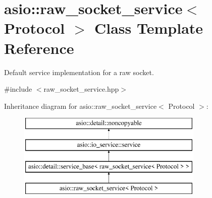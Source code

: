 \hypertarget{classasio_1_1raw__socket__service}{}\section{asio\+:\+:raw\+\_\+socket\+\_\+service$<$ Protocol $>$ Class Template Reference}
\label{classasio_1_1raw__socket__service}


Default service implementation for a raw socket.  




{\ttfamily \#include $<$raw\+\_\+socket\+\_\+service.\+hpp$>$}

Inheritance diagram for asio\+:\+:raw\+\_\+socket\+\_\+service$<$ Protocol $>$\+:\begin{figure}[H]
\begin{center}
\leavevmode
\includegraphics[height=4.000000cm]{classasio_1_1raw__socket__service}
\end{center}
\end{figure}
